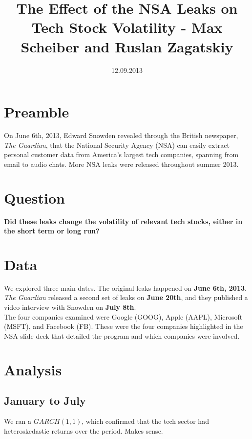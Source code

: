 \documentclass[10pt]{amsart}
\title{The Effect of the NSA Leaks on Tech Stock Volatility - Max Scheiber and Ruslan Zagatskiy}
\date{12.09.2013}
\begin{document}
\maketitle
\section{Preamble}
On June 6th, 2013, Edward Snowden revealed through the British newspaper, \textit{The Guardian}, that the National Security Agency (NSA) can easily extract personal customer data from America's largest tech companies, spanning from email to audio chats. More NSA leaks were released throughout summer 2013.

\section{Question}
\textbf{Did these leaks change the volatility of relevant tech stocks, either in the short term or long run?}

\section{Data}
We explored three main dates. The original leaks happened on \textbf{June 6th, 2013}. \textit{The Guardian} released a second set of leaks on \textbf{June 20th}, and they published a video interview with Snowden on \textbf{July 8th}. \\

The four companies examined were Google (GOOG), Apple (AAPL), Microsoft (MSFT), and Facebook (FB). These were the four companies highlighted in the NSA slide deck that detailed the program and which companies were involved.

\section{Analysis}
\subsection{January to July}
We ran a $GARCH(1,1)$, which confirmed that the tech sector had heteroskedastic returns over the period. Makes sense.
\end{document}
